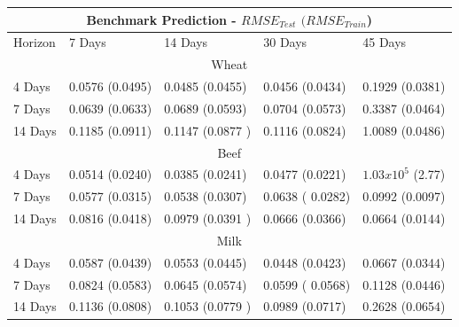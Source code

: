 \begin{tabular}{ |p{3cm}||p{3cm}|p{3cm}|p{3cm}| p{3cm}|  }
 \hline
 \multicolumn{5}{|c|}{Benchmark Prediction - $RMSE_{Test}$ $(RMSE_{Train}$) } \\
 \hline
 Horizon & 7 Days & 14 Days & 30 Days  & 45 Days  \\

 \hline
  \multicolumn{5}{|c|}{Wheat} \\
  \hline
 4 Days & 0.0576  (0.0495)  & 0.0485 (0.0455)   & 0.0456 (0.0434) & 0.1929  (0.0381) \\
 7 Days &0.0639 (0.0633) & 0.0689 (0.0593) &   0.0704 (0.0573) & 0.3387  (0.0464)\\
 14 Days & 0.1185 (0.0911)  & 0.1147  (0.0877 ) & 0.1116 (0.0824) & 1.0089 (0.0486)  \\
 \hline
  \multicolumn{5}{|c|}{Beef} \\
  \hline
   4 Days & 0.0514 (0.0240)  & 0.0385 (0.0241)   & 0.0477 (0.0221) & $1.03 x 10^5$ (2.77) \\
 7 Days & 0.0577 (0.0315) & 0.0538 (0.0307) &   0.0638 ( 0.0282) & 0.0992  (0.0097)\\
 14 Days & 0.0816 (0.0418)  & 0.0979  (0.0391 ) & 0.0666 (0.0366) & 0.0664 (0.0144)  \\
   \hline
  \multicolumn{5}{|c|}{Milk} \\
  \hline
    4 Days & 0.0587 (0.0439)  &  0.0553 (0.0445)   & 0.0448 (0.0423) & 0.0667  (0.0344) \\
 7 Days & 0.0824 (0.0583) &  0.0645 (0.0574) &   0.0599 ( 0.0568) & 0.1128  (0.0446)\\
 14 Days & 0.1136  (0.0808)  & 0.1053  (0.0779 ) & 0.0989 (0.0717) & 0.2628 (0.0654)  \\
  
 \hline
\end{tabular}


